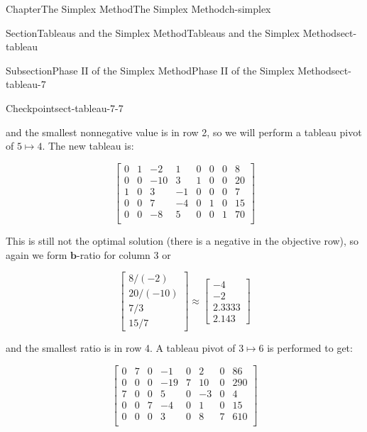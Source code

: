 \documentclass[oneside,10pt,]{book}
\numberwithin{equation}{section}
\newcommand{\amp}{&}
\begin{document}
\begin{chapterptx}{Chapter}{The Simplex Method}{}{The Simplex Method}{}{}{ch-simplex}
\begin{sectionptx}{Section}{Tableaus and the Simplex Method}{}{Tableaus and the Simplex Method}{}{}{sect-tableau}
\begin{subsectionptx}{Subsection}{Phase II of the Simplex Method}{}{Phase II of the Simplex Method}{}{}{sect-tableau-7}
\begin{inlineexercise}{Checkpoint}{}{sect-tableau-7-7}
\begin{equation*}
\end{equation*}
%
\par
and the smallest nonnegative value is in row 2, so we will perform a tableau pivot of \(5 \mapsto 4\). The new tableau is:%
\par
%
\begin{equation*}
\left[\begin{array}{rr|rrrrr|r} 0 \amp 1 \amp -2 \amp 1 \amp 0 \amp 0 \amp 0 \amp 8\\ 0 \amp 0 \amp -10 \amp 3 \amp 1 \amp 0 \amp 0 \amp 20\\ 1 \amp 0 \amp 3 \amp -1 \amp 0 \amp 0 \amp 0 \amp 7\\ 0 \amp 0 \amp 7 \amp -4 \amp 0 \amp 1 \amp 0 \amp 15\\ \hline 0 \amp 0 \amp -8 \amp 5 \amp 0 \amp 0 \amp 1 \amp 70\\ \end{array} \right]
\end{equation*}
%
\par
This is still not the optimal solution (there is a negative in the objective row), so again we form \(\boldsymbol{b}\)-ratio for column 3 or%
\par
%
\begin{equation*}
\begin{bmatrix} 8/(-2) \\ 20/(-10) \\ 7/3 \\ 15/7 \end{bmatrix} \approx \begin{bmatrix} -4 \\ -2 \\ 2.3333 \\ 2.143 \end{bmatrix}
\end{equation*}
%
\par
and the smallest ratio is in row 4. A tableau pivot of \(3 \mapsto 6\) is performed to get:%
\par
%
\begin{equation*}
\left[\begin{array}{rr|rrrrr|r} 0 \amp 7 \amp 0 \amp -1 \amp 0 \amp 2 \amp 0 \amp 86\\ 0 \amp 0 \amp 0 \amp -19 \amp 7 \amp 10 \amp 0 \amp 290\\ 7 \amp 0 \amp 0 \amp 5 \amp 0 \amp -3 \amp 0 \amp 4\\ 0 \amp 0 \amp 7 \amp -4 \amp 0 \amp 1 \amp 0 \amp 15\\ \hline 0 \amp 0 \amp 0 \amp 3 \amp 0 \amp 8 \amp 7 \amp 610\\ \end{array} \right]

\end{equation*}
\end{inlineexercise}
\end{subsectionptx}
\end{sectionptx}
\end{chapterptx}
\end{document}
